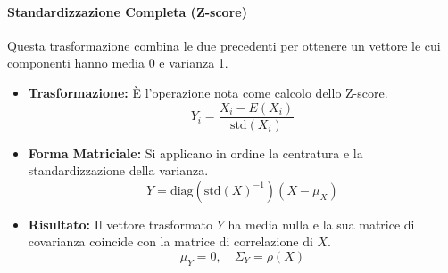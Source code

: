 \paragraph{Standardizzazione Completa (Z-score)}
Questa trasformazione combina le due precedenti per ottenere un vettore le cui
componenti hanno media 0 e varianza 1.
\begin{itemize}
    \item \textbf{Trasformazione:} È l'operazione nota come calcolo dello
    Z-score.
    \[ Y_i = \frac{X_i - E(X_i)}{\text{std}(X_i)} \]
    \item \textbf{Forma Matriciale:} Si applicano in ordine la centratura e la
    standardizzazione della varianza.
    \[ Y = \text{diag}(\text{std}(X)^{-1}) (X - \mu_X) \]
    \item \textbf{Risultato:} Il vettore trasformato \(Y\) ha media nulla e la
    sua matrice di covarianza coincide con la matrice di correlazione di \(X\).
    \[ \mu_Y = 0, \quad \Sigma_Y = \rho(X) \]
\end{itemize}

